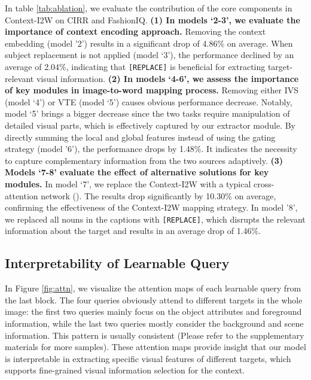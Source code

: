 \documentclass[letterpaper]{article} \usepackage{aaai24}  \usepackage{times}  \usepackage{helvet}  \usepackage{courier}  \usepackage[hyphens]{url}  \usepackage{graphicx} \urlstyle{rm} \def\UrlFont{\rm}  \usepackage{natbib}  \usepackage{caption} \frenchspacing  \setlength{\pdfpagewidth}{8.5in} \setlength{\pdfpageheight}{11in} \usepackage{algorithm}
\begin{document}
In table \ref{tab:ablation}, we evaluate the contribution of the core components in Context-I2W on CIRR and FashionIQ. \textbf{(1) In models `2-3', we evaluate the importance of context encoding approach.} Removing the context embedding   (model '2') results in a significant drop of 4.86\% on average. 
When subject replacement is not applied (model `3'), the performance declined by an average of 2.04\%, indicating that \texttt{[REPLACE]} is beneficial for extracting target-relevant visual information. 
\textbf{(2) In models `4-6', we assess the importance of key modules in image-to-word mapping process.} Removing either IVS (model `4') or VTE (model `5') causes obvious performance decrease. Notably, model `5' brings a bigger decrease since the two tasks require manipulation of detailed visual parts, which is effectively captured by our extractor module. 
By directly summing the local and global features instead of using the gating strategy (model '6'), the performance drops by 1.48\%. It indicates the necessity to capture complementary information from the two sources adaptively. \textbf{(3) Models `7-8' evaluate the effect of alternative solutions for key modules.} In model `7', we  replace the Context-I2W with a typical cross-attention network (). The results drop significantly by 10.30\% on average, confirming the effectiveness of the Context-I2W mapping strategy. In model '8', we replaced all nouns in the captions with \texttt{[REPLACE]}, which disrupts the relevant information about the target and results in an average drop of 1.46\%.

\subsection{Interpretability of Learnable Query}

In Figure \ref{fig:attn}, we visualize the attention maps of each learnable query from the last block. The four queries obviously attend to different targets in the whole image: the first two queries mainly focus on the object attributes and foreground information, while the last two queries mostly consider the background and scene information. This pattern is usually consistent (Please refer to the supplementary materials for more samples). These attention maps provide insight that our model is interpretable in extracting specific visual features of different targets, which supports fine-grained visual information selection for the context.
\end{document}
